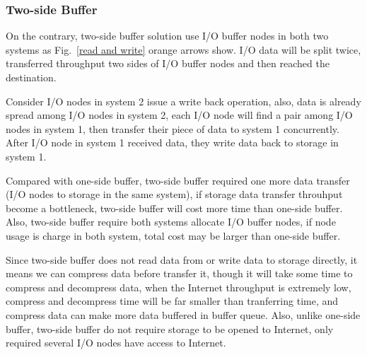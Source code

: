 \subsubsection{Two-side Buffer}

On the contrary, two-side buffer solution use I/O buffer nodes in both two systems as Fig.~\ref{read and write} orange arrows show.
I/O data will be split twice, transferred throughput two sides of I/O buffer nodes and then reached the destination.

Consider I/O nodes in system 2 issue a write back operation, also, data is already spread among I/O nodes in system 2, each I/O node will find a pair among I/O nodes in system 1, then transfer their piece of data to system 1 concurrently.
After I/O node in system 1 received data, they write data back to storage in system 1.

Compared with one-side buffer, two-side buffer required one more data transfer (I/O nodes to storage in the same system), if storage data transfer throuhput become a bottleneck, two-side buffer will cost more time than one-side buffer.
Also, two-side buffer require both systems allocate I/O buffer nodes, if node usage is charge in both system, total cost may be larger than one-side buffer.

Since two-side buffer does not read data from or write data to storage directly, it means we can compress data before transfer it, though it will take some time to compress and decompress data, when the Internet throughput is extremely low, compress and decompress time will be far smaller than tranferring time, and compress data can make more data buffered in buffer queue.
Also, unlike one-side buffer, two-side buffer do not require storage to be opened to Internet, only required several I/O nodes have access to Internet.



